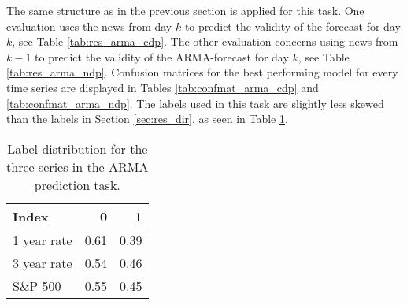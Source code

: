 The same structure as in the previous section is applied for this task. One evaluation uses the news from day $k$ to predict the validity of the forecast for day $k$, see Table \ref{tab:res_arma_cdp}. The other evaluation concerns using news from $k-1$ to predict the validity of the ARMA-forecast for day $k$, see Table \ref{tab:res_arma_ndp}. Confusion matrices for the best performing model for every time series are displayed in Tables \ref{tab:confmat_arma_cdp} and \ref{tab:confmat_arma_ndp}.
The labels used in this task are slightly less skewed than the labels in Section \ref{sec:res_dir}, as seen in Table \ref{tab:label_dist2}.

\begin{table}[h]
    \centering
    \begin{tabular}{lrr}
       \textbf{Index}  & \textbf{0} & \textbf{1} \\
        \hline \hline 
        1 year rate & 0.61 & 0.39 \\
        3 year rate & 0.54 & 0.46 \\
        S\&P 500 & 0.55 & 0.45  \\
        \hline 
    \end{tabular}
    \caption{Label distribution for the three series in the ARMA prediction task. }
    \label{tab:label_dist2}
\end{table}



